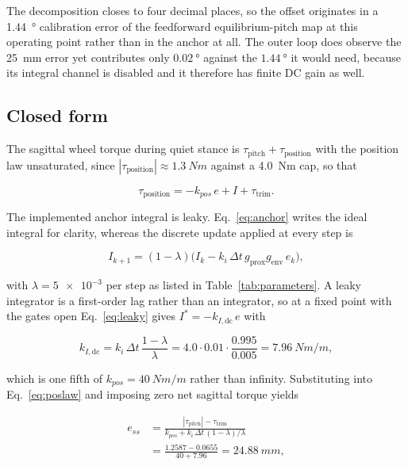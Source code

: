 \documentclass[a4paper,fleqn]{cas-dc}
\begin{document}
The decomposition closes to four decimal places, so the offset originates in a
\SI{1.44}{\degree} calibration error of the feedforward equilibrium-pitch map at
this operating point rather than in the anchor at all. The outer loop does
observe the \SI{25}{mm} error yet contributes only $\SI{0.02}{\degree}$ against
the $\SI{1.44}{\degree}$ it would need, because its integral channel is disabled
and it therefore has finite DC gain as well.

\subsection{Closed form}

The sagittal wheel torque during quiet stance is
$\tau_{\text{pitch}}+\tau_{\text{position}}$ with the position law unsaturated,
since $|\tau_{\text{position}}|\approx\SI{1.3}{Nm}$ against a \SI{4.0}{Nm} cap,
so that

\begin{equation}
\tau_{\text{position}} = -k_{pos}\,e + I + \tau_{\text{trim}}.
\label{eq:poslaw}
\end{equation}

The implemented anchor integral is leaky. Eq.~\eqref{eq:anchor} writes the ideal
integral for clarity, whereas the discrete update applied at every step is

\begin{equation}
I_{k+1} = (1-\lambda)\bigl(I_k - k_i\,\Delta t\,g_{\text{prox}}g_{\text{env}}\,e_k\bigr),
\label{eq:leaky}
\end{equation}

with $\lambda{=}\num{5e-3}$ per step as listed in Table~\ref{tab:parameters}. A
leaky integrator is a first-order lag rather than an integrator, so at a fixed
point with the gates open Eq.~\eqref{eq:leaky} gives $I^{*}=-k_{I,\text{dc}}\,e$
with

\begin{equation}
k_{I,\text{dc}} = k_i\,\Delta t\,\frac{1-\lambda}{\lambda}
= \num{4.0}\cdot\num{0.01}\cdot\frac{\num{0.995}}{\num{0.005}}
= \SI{7.96}{Nm/m},
\label{eq:kidc}
\end{equation}

which is one fifth of $k_{pos}{=}\SI{40}{Nm/m}$ rather than infinity.
Substituting into Eq.~\eqref{eq:poslaw} and imposing zero net sagittal torque
yields

\begin{align}
e_{ss} &= \frac{|\tau_{\text{pitch}}| - \tau_{\text{trim}}}
               {k_{pos} + k_i\,\Delta t\,(1-\lambda)/\lambda} \nonumber\\
       &= \frac{\num{1.2587}-\num{0.0655}}{\num{40}+\num{7.96}}
        = \SI{24.88}{mm},
\label{eq:parking}
\end{align}
\end{document}
